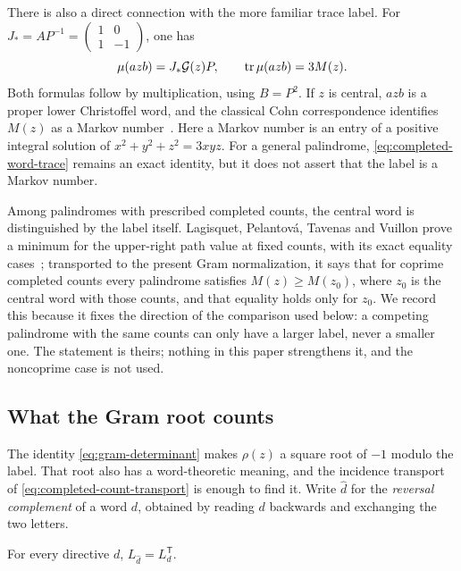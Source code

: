 There is also a direct connection with the more familiar trace label.
For $J_*=AP^{-1}=\left(\begin{smallmatrix}1&0\\1&-1\end{smallmatrix}\right)$,
one has
\begin{equation}\label{eq:completed-word-trace}
 \mu(azb)=J_*\mathcal{G}(z)P,
 \qquad \operatorname{tr}\mu(azb)=3M(z).
\end{equation}
Both formulas follow by multiplication, using $B=P^2$.
If $z$ is central, $azb$ is a proper lower Christoffel word, and
the classical Cohn correspondence identifies $M(z)$ as a Markov
number~\cite[Theorem~1]{Reutenauer2009}. Here a Markov number is an entry of a positive integral
solution of $x^2+y^2+z^2=3xyz$. For a general palindrome,
\eqref{eq:completed-word-trace} remains an exact identity, but it
does not assert that the label is a Markov number.

Among palindromes with prescribed completed counts, the central word is
distinguished by the label itself. Lagisquet, Pelantov\'a, Tavenas and
Vuillon prove a minimum for the upper-right path value at fixed counts,
with its exact equality cases~\cite[Proposition~21]{LagisquetEtAl2021};
transported to the present Gram normalization, it says that for coprime
completed counts every palindrome satisfies $M(z)\geqslant M(z_0)$,
where $z_0$ is the central word with those counts, and that equality
holds only for $z_0$. We record this because it fixes the direction of
the comparison used below: a competing palindrome with the same counts
can only have a larger label, never a smaller one. The statement is
theirs; nothing in this paper strengthens it, and the noncoprime case is
not used.

\subsection{What the Gram root counts}
\label{subsec:gram-root-counts}

The identity \eqref{eq:gram-determinant} makes $\rho(z)$ a square root
of $-1$ modulo the label. That root also has a word-theoretic meaning,
and the incidence transport of
\eqref{eq:completed-count-transport} is enough to find it. Write
$\widehat d$ for the \emph{reversal complement} of a word $d$, obtained
by reading $d$ backwards and exchanging the two letters.

\begin{lemma}
\label{lem:incidence-transpose}
For every directive $d$, $L_{\widehat d}=L_d^{\mathsf T}$.
\end{lemma}

